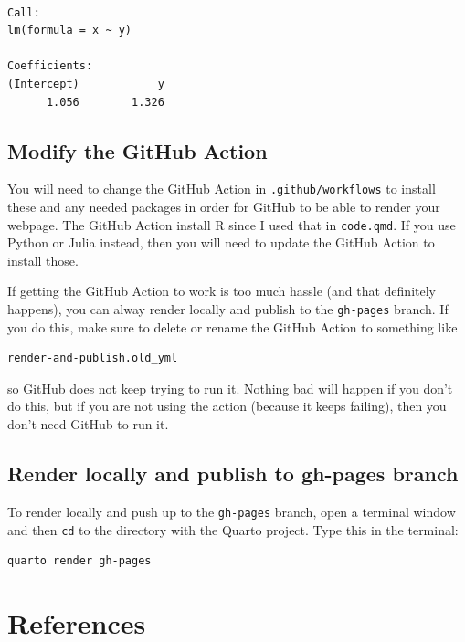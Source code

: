 \documentclass[
  letterpaper,
  oneside,
  open=any]{scrbook}
\begin{document}
\begin{verbatim}

Call:
lm(formula = x ~ y)

Coefficients:
(Intercept)            y  
      1.056        1.326  
\end{verbatim}

\section{Modify the GitHub Action}\label{modify-the-github-action}

You will need to change the GitHub Action in \texttt{.github/workflows}
to install these and any needed packages in order for GitHub to be able
to render your webpage. The GitHub Action install R since I used that in
\texttt{code.qmd}. If you use Python or Julia instead, then you will
need to update the GitHub Action to install those.

If getting the GitHub Action to work is too much hassle (and that
definitely happens), you can alway render locally and publish to the
\texttt{gh-pages} branch. If you do this, make sure to delete or rename
the GitHub Action to something like

\begin{verbatim}
render-and-publish.old_yml
\end{verbatim}

so GitHub does not keep trying to run it. Nothing bad will happen if you
don't do this, but if you are not using the action (because it keeps
failing), then you don't need GitHub to run it.

\section{Render locally and publish to gh-pages
branch}\label{render-locally-and-publish-to-gh-pages-branch}

To render locally and push up to the \texttt{gh-pages} branch, open a
terminal window and then \texttt{cd} to the directory with the Quarto
project. Type this in the terminal:

\begin{verbatim}
quarto render gh-pages
\end{verbatim}


\chapter{References}\label{references}
\end{document}
